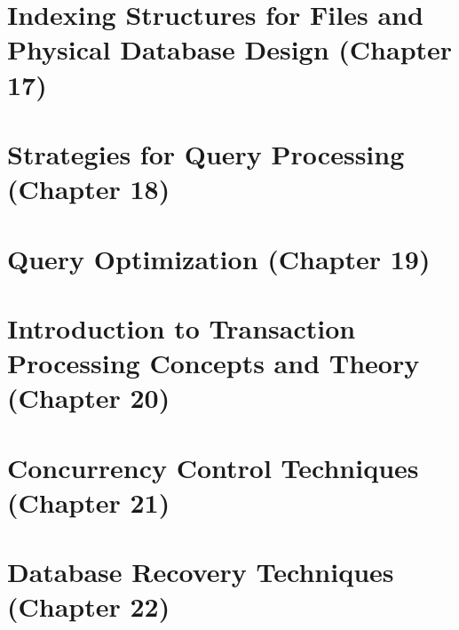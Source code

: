 \documentclass{report}
\begin{document}
\chapter{Indexing Structures for Files and Physical Database Design (Chapter 17)}


\chapter{Strategies for Query Processing (Chapter 18)}


\chapter{Query Optimization (Chapter 19)}


\chapter{Introduction to Transaction Processing Concepts and Theory (Chapter 20)}


\chapter{Concurrency Control Techniques (Chapter 21)}
\label{chap-concurrency-control}


\chapter{Database Recovery Techniques (Chapter 22)}

\end{document}
